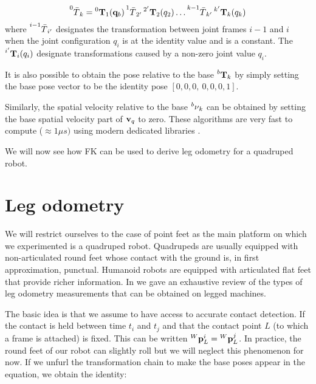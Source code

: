 \begin{equation}
    \prescript{0}{}{\bar{T}}_{k} = \prescript{0}{}{{\bf T}}_{1}({\bf q}_b) \prescript{1}{}{\bar{T}}_{2'}
    \prescript{2'}{}{{\bf T}}_{2}(q_2) \dots  \prescript{k-1}{}{\bar{T}}_{k'} \prescript{k'}{}{{\bf T}}_{k}(q_k)
\end{equation}
%
where $\prescript{i-1}{}{\bar{T}}_{i'}$ designates the transformation between joint frames $i-1$ and $i$ when the joint configuration $q_i$ is at the identity value and is a constant. The $\prescript{i'}{}{{\bf T}}_{i}(q_i)$ designate transformations caused by a non-zero joint value $q_i$.

It is also possible to obtain the pose relative to the base $\prescript{b}{}{{\bf T}}_{k}$ by simply setting the base pose vector to be the identity pose $[0,0,0,~0,0,0,1]$.



Similarly, the spatial velocity relative to the base $\prescript{b}{}{\mathbf{\nu}}_k$ can be obtained by setting the base spatial velocity part of ${\bf v}_q$ to zero.
These algorithms are very fast to compute ($\approx 1\mu s)$ using modern dedicated libraries \cite{carpentier2019pinocchio}.

We will now see how FK can be used to derive leg odometry for a quadruped robot.

\section{Leg odometry}
We will restrict ourselves to the case of point feet as the main platform on which we experimented is a quadruped robot.
Quadrupeds are usually equipped with non-articulated round feet whose contact with the ground is, in first approximation, punctual.
Humanoid robots are equipped with articulated flat feet that provide richer information. In  we gave an exhaustive review of the types of leg 
odometry measurements that can be obtained on legged machines.

The basic idea is that we assume to have access to accurate contact detection. If the contact is held between time $t_i$ and $t_j$ and that
the contact point $L$ (to which a frame is attached) is fixed. This can be written $\prescript{W}{}{{\bf p}}_{L}^i = \prescript{W}{}{{\bf p}}_{L}^j$. 
In practice, the round feet of our robot can slightly roll but we will neglect this phenomenon for now. 
If we unfurl the transformation chain to make the base poses appear in the equation, we obtain the identity:


